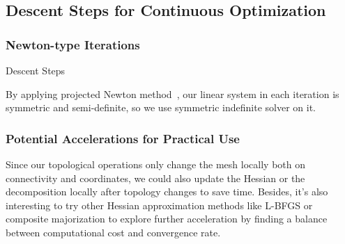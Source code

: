 
\subsection{Descent Steps for Continuous Optimization}
\label{sec:descentStep}

\subsubsection{Newton-type Iterations}

\begin{algorithm}[h]
\SetAlgoLined
{}
\caption{Descent Steps}
\end{algorithm}
By applying projected Newton method~\cite{Teran2005Robust}, our linear system in each iteration is symmetric and semi-definite, so we use symmetric indefinite solver on it.


\subsubsection{Potential Accelerations for Practical Use}

Since our topological operations only change the mesh locally both on connectivity and coordinates, we could also update the Hessian or the decomposition locally after topology changes to save time. Besides, it's also interesting to try other Hessian approximation methods like L-BFGS \cite{Liu1989Limited} or composite majorization \cite{Shtengel2017Geometric} to explore further acceleration by finding a balance between computational cost and convergence rate.

